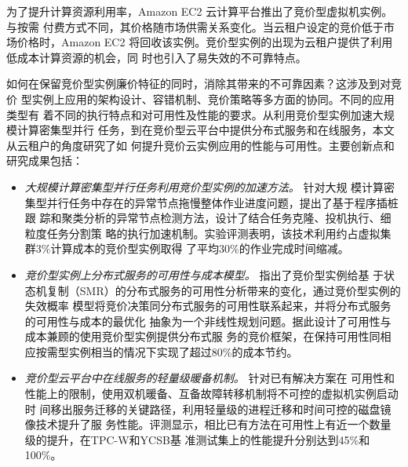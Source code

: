 \begin{cabstract}
  为了提升计算资源利用率，Amazon EC2 云计算平台推出了竞价型虚拟机实例。与按需
  付费方式不同，其价格随市场供需关系变化。当云租户设定的竞价低于市场价格时，Amazon 
  EC2 将回收该实例。竞价型实例的出现为云租户提供了利用低成本计算资源的机会，同
  时也引入了易失效的不可靠特点。

  如何在保留竞价型实例廉价特征的同时，消除其带来的不可靠因素？这涉及到对竞价
  型实例上应用的架构设计、容错机制、竞价策略等多方面的协同。不同的应用类型有
  着不同的执行特点和对可用性及性能的要求。从利用竞价型实例加速大规模计算密集型并行
  任务，到在竞价型云平台中提供分布式服务和在线服务，本文从云租户的角度研究了如
  何提升竞价云实例应用的性能与可用性。主要创新点和研究成果包括：
  \begin{itemize}
    \item \emph{大规模计算密集型并行任务利用竞价型实例的加速方法。} 针对大规
    模计算密集型并行任务中存在的异常节点拖慢整体作业进度问题，提出了基于程序插桩跟
    踪和聚类分析的异常节点检测方法，设计了结合任务克隆、投机执行、细粒度任务分割策
    略的执行加速机制。实验评测表明，该技术利用约占虚拟集群3\%计算成本的竞价型实例取得
    了平均30\%的作业完成时间缩减。
    \item \emph{竞价型实例上分布式服务的可用性与成本模型。} 指出了竞价型实例给基
    于状态机复制（SMR）的分布式服务的可用性分析带来的变化，通过竞价型实例的失效概率
    模型将竞价决策同分布式服务的可用性联系起来，并将分布式服务的可用性与成本的最优化
    抽象为一个非线性规划问题。据此设计了可用性与成本兼顾的使用竞价型实例提供分布式服
    务的竞价框架，在保持可用性同相应按需型实例相当的情况下实现了超过80\%的成本节约。
    \item \emph{竞价型云平台中在线服务的轻量级暖备机制。} 针对已有解决方案在
    可用性和性能上的限制，使用双机暖备、互备故障转移机制将不可控的虚拟机实例启动时
    间移出服务迁移的关键路径，利用轻量级的进程迁移和时间可控的磁盘镜像技术提升了服
    务性能。评测显示，相比已有方法在可用性上有近一个数量级的提升，在TPC-W和YCSB基
    准测试集上的性能提升分别达到45\%和100\%。
  \end{itemize}

\end{cabstract}


